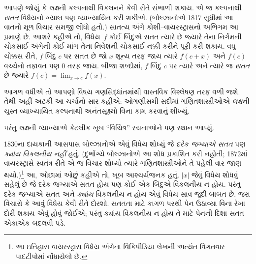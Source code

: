 આપણે જોયું કે \emph{લક્ષ}ની કલ્પનાથી
વિકલનને કેવી રીતે સંભાળી શકાય.
એ જ કલ્પનાથી \emph{સતત} વિધેયનો
ખ્યાલ પણ વ્યાખ્યાયિત કરી શકીએ.
(બોલ્ઝાનોએ 1817 સુધીમાં આ વાતનો
મૂળ વિચાર સમજી લીધો હતો.)
સાતત્ય અંગે કોશી--વાયરસ્ટ્રાસનો
અભિગમ આ પ્રમાણે છે. આશરે કહીએ તો,
વિધેય~$f$ કોઈ બિંદુએ સતત ત્યારે છે
જ્યારે તેના નિર્ગમની ચોકસાઈ અંગેની
કોઈ માંગ તેના નિવેશની ચોકસાઈ
નક્કી કરીને પૂરી કરી શકાય.
વધુ ચોક્કસ રીતે, $f$ બિંદુ $c$
પર સતત છે જો $x$ શૂન્ય તરફ
જાય ત્યારે $f(c + x)$ અને $f(c)$
વચ્ચેનો તફાવત પણ $0$ તરફ જાય.
બીજા શબ્દોમાં, $f$ બિંદુ $c$
પર ત્યારે અને ત્યારે જ
\emph{સતત} છે જ્યારે
$f(c) = \lim_{x \rightarrow c} f(x)$.

આગળ વધીએ તો આપણો વિષય ગણસિદ્ધાંતમાંથી
વાસ્તવિક વિશ્લેષણ તરફ વળી જશે. તેથી
અહીં અટકી આ ચર્ચાનો સાર કહીએ:
ઓગણીસમી સદીમાં ગણિતશાસ્ત્રીઓએ
\emph{લક્ષ}ની ચુસ્ત વ્યાખ્યાયિત કલ્પનાથી
અનંતસૂક્ષ્મો વિના કામ કરવાનું શીખ્યું.
\endgroup

\begingroup
\makeatletter{}\makeatother

\label{guunit:OLP-0636}


પરંતુ \emph{લક્ષ}ની વ્યાખ્યાએ કેટલીક ખૂબ
“વિચિત્ર” રચનાઓને પણ સ્થાન આપ્યું.

1830ના દાયકાની આસપાસ બોલ્ઝાનોએ એવું
વિધેય શોધ્યું જે \emph{દરેક જગ્યાએ સતત}
પણ \emph{ક્યાંય વિકલનીય નહીં} હતું.
(દુર્ભાગ્યે બોલ્ઝાનોએ આ શોધ પ્રકાશિત
કરી નહોતી; 1872માં વાયરસ્ટ્રાસે સ્વતંત્ર
રીતે એ જ વિચાર શોધ્યો ત્યારે ગણિતશાસ્ત્રીઓને
તે પહેલી વાર જાણ થયો.)\footnote{આ ઇતિહાસ
\href{http://en.wikipedia.org/wiki/Weierstrass_function}{વાયરસ્ટ્રાસ
વિધેય} અંગેના વિકિપીડિયા લેખની અત્યંત
વિગતવાર પાદટીપોમાં નોંધાયેલો છે.}
આ, ઓછામાં ઓછું કહીએ તો, ખૂબ આશ્ચર્યજનક
હતું. $|x|$ જેવું વિધેય શોધવું સહેલું છે
જે દરેક જગ્યાએ સતત હોય પણ કોઈ એક
બિંદુએ વિકલનીય ન હોય. પરંતુ દરેક
જગ્યાએ સતત અને \emph{ક્યાંય}
વિકલનીય ન હોય એવું વિધેય સાવ
જુદી બાબત છે. જરા વિચારો કે
આવું વિધેય કેવી રીતે દોરશો.
સતતતા માટે કાગળ પરથી પેન
ઉઠાવ્યા વિના રેખા દોરી શકાય
એવું હોવું જોઈએ; પરંતુ ક્યાંય
વિકલનીય ન હોય તે માટે પેનની
દિશા સતત એકાએક બદલવી પડે.

